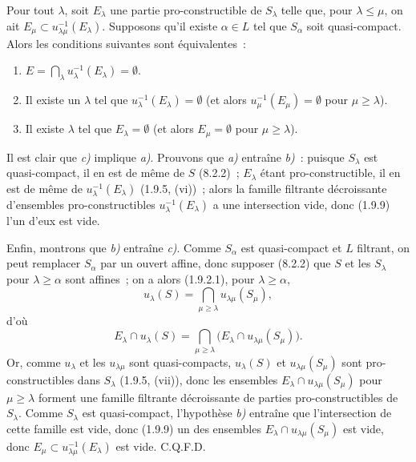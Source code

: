 \begin{corollary}[8.3.3]
\label{IV.8.3.3-fr}
Pour tout $\lambda$, soit $E_\lambda$ une partie pro-constructible de
$S_\lambda$ telle que, pour $\lambda\leq\mu$, on ait
$E_\mu\subset u_{\lambda\mu}^{-1}(E_\lambda)$. Supposons qu'il existe
$\alpha\in L$ tel que $S_\alpha$ soit quasi-compact. Alors les conditions
suivantes sont équivalentes~:
\begin{enumerate}
\item[\emph{a)}]
$E=\bigcap_\lambda u_\lambda^{-1}(E_\lambda)=\emptyset$.
\item[\emph{b)}] Il existe un $\lambda$ tel que
$u_\lambda^{-1}(E_\lambda)=\emptyset$ (et alors
$u_\mu^{-1}(E_\mu)=\emptyset$ pour $\mu\geq\lambda$).
\item[\emph{c)}] Il existe $\lambda$ tel que $E_\lambda=\emptyset$ (et alors
$E_\mu=\emptyset$ pour $\mu\geq\lambda$).
\end{enumerate}
\end{corollary}

Il est clair que \emph{c)} implique \emph{a)}. Prouvons que \emph{a)} entraîne
\emph{b)}~: puisque $S_\lambda$ est quasi-compact, il en est de même de $S$
(8.2.2)~; $E_\lambda$ étant pro-constructible, il en est de même de
$u_\lambda^{-1}(E_\lambda)$ (1.9.5, (vi))~; alors la famille filtrante
décroissante d'ensembles pro-constructibles $u_\lambda^{-1}(E_\lambda)$ a
une intersection vide, donc (1.9.9) l'un d'eux est vide.

Enfin, montrons que \emph{b)} entraîne \emph{c)}. Comme $S_\alpha$ est
quasi-compact et $L$ filtrant, on peut remplacer $S_\alpha$ par un ouvert
affine, donc supposer (8.2.2) que $S$ et les $S_\lambda$ pour
$\lambda\geq\alpha$ sont affines~; on a alors (1.9.2.1), pour
$\lambda\geq\alpha$,
\[
u_\lambda(S)=\bigcap_{\mu\geq\lambda}u_{\lambda\mu}(S_\mu),
\]
d'où
\[
E_\lambda\cap u_\lambda(S)=
\bigcap_{\mu\geq\lambda}
\bigl(E_\lambda\cap u_{\lambda\mu}(S_\mu)\bigr).
\]
Or, comme $u_\lambda$ et les $u_{\lambda\mu}$ sont quasi-compacts,
$u_\lambda(S)$ et $u_{\lambda\mu}(S_\mu)$ sont pro-constructibles dans
$S_\lambda$ (1.9.5, (vii)), donc les ensembles
$E_\lambda\cap u_{\lambda\mu}(S_\mu)$ pour $\mu\geq\lambda$ forment une
famille filtrante décroissante de parties pro-constructibles de $S_\lambda$.
Comme $S_\lambda$ est quasi-compact, l'hypothèse \emph{b)} entraîne que
l'intersection de cette famille est vide, donc (1.9.9) un des ensembles
$E_\lambda\cap u_{\lambda\mu}(S_\mu)$ est vide, donc
$E_\mu\subset u_{\lambda\mu}^{-1}(E_\lambda)$ est vide. C.Q.F.D.

